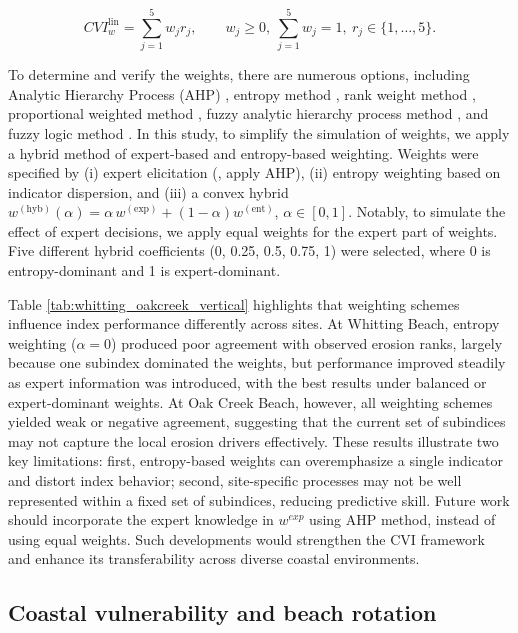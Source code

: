 \begin{equation}
CVI^{\text{lin}}_w = \sum_{j=1}^{5} w_j r_j,\qquad
w_j \ge 0,\ \sum_{j=1}^{5} w_j = 1,\ r_j \in \{1,\ldots,5\}.
\end{equation}

To determine and verify the weights, there are numerous options, including
Analytic Hierarchy Process (AHP)
\citep{mosadeghi2015comparison,cabrera2019flood,saffarian2020measuring}, entropy
method \citep{cabrera2020flood}, rank weight method \citep{alam2020cyclone},
proportional weighted method \citep{dou2018flood}, fuzzy analytic hierarchy
process method \citep{wijitkosum2019fuzzy}, and fuzzy logic method
\citep{hoque2021cyclone}. In this study, to simplify the simulation of weights,
we apply a hybrid method of expert-based and entropy-based weighting. Weights
were specified by (i) expert elicitation (\eg, apply AHP), (ii) entropy
weighting based on indicator dispersion, and (iii) a convex hybrid
\(w^{(\mathrm{hyb})}(\alpha) = \alpha\,w^{(\mathrm{exp})} +
(1-\alpha)w^{(\mathrm{ent})}\), \(\alpha\in[0,1]\). Notably, to simulate the
effect of expert decisions, we apply equal weights for the expert part of
weights. Five different hybrid coefficients (0, 0.25, 0.5, 0.75, 1) were
selected, where 0 is entropy-dominant and 1 is expert-dominant.

Table \ref{tab:whitting_oakcreek_vertical} highlights that weighting schemes
influence index performance differently across sites. At Whitting Beach, entropy
weighting (\(\alpha=0\)) produced poor agreement with observed erosion ranks,
largely because one subindex dominated the weights, but performance improved
steadily as expert information was introduced, with the best results under
balanced or expert-dominant weights. At Oak Creek Beach, however, all weighting
schemes yielded weak or negative agreement, suggesting that the current set of
subindices may not capture the local erosion drivers effectively. These results
illustrate two key limitations: first, entropy-based weights can overemphasize a
single indicator and distort index behavior; second, site-specific processes may
not be well represented within a fixed set of subindices, reducing predictive
skill. Future work should incorporate the expert knowledge in $w^{exp}$ using
AHP method, instead of using equal weights. Such developments would strengthen
the CVI framework and enhance its transferability across diverse coastal
environments.



\subsection{Coastal vulnerability and beach rotation}
\label{rotation}

